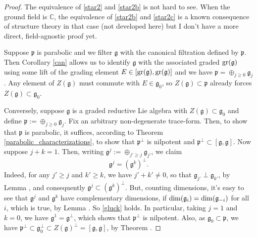 \documentclass[leqno,12pt]{amsart} %
\begin{document}
\begin{proof}
  The equivalence of \eqref{star2} and \eqref{star2b} is not hard to see. When the ground
  field is ${\mathbb C} $, the equivalence of \eqref{star2b} and \eqref{star2c} is a known
  consequence of structure theory in that case (not developed here) but I don't have a
  more direct, field-agnostic proof yet.

  Suppose ${\mathfrak p} $ is parabolic and we filter ${\mathfrak g} $ with the canonical
  filtration defined by ${\mathfrak p}$. Then Corollary \ref{can} allows us to identify
  ${\mathfrak g} $ with the associated graded $\operatorname{\operatorname{gr}}({\mathfrak g})$ using some lift of
  the grading element $E \in [\operatorname{\operatorname{gr}}({\mathfrak g}), \operatorname{\operatorname{gr}}({\mathfrak g})]$ and we have
  ${\mathfrak p} = \oplus_{j\ge 0}{\mathfrak g}_j$. Any element of $Z({\mathfrak g})$ must
  commute with $E \in {\mathfrak g}_0$, so $Z({\mathfrak g}) \subset {\mathfrak p} $
  already forces $Z({\mathfrak g}) \subset {\mathfrak g}_0$.

  Conversely, suppose ${\mathfrak g} $ is a graded reductive Lie algebra with
  $Z({\mathfrak g}) \subset {\mathfrak g}_0$ and define
  ${\mathfrak p}:=\oplus_{j\ge 0}{\mathfrak g}_j$. Fix an arbitrary non-degenerate
  trace-form. Then, to show that ${\mathfrak p} $ is parabolic, it suffices, according to
  Theorem \ref{parabolic_characterizations}, to show that ${\mathfrak p}^\perp$ is
  nilpotent and ${\mathfrak p}^\perp\subset [{\mathfrak g}, {\mathfrak g}]$. Now suppose
  $j + k =1$. Then, writing ${\mathfrak g}^j := \oplus_{j'\ge j}{\mathfrak g}_{j'}$, we
  claim
  \begin{equation}\label{gluck}
    {\mathfrak g}^j = ({\mathfrak g}^k)^\perp.
  \end{equation}
  Indeed, for any $j'\ge j$ and $k' \ge k$, we have $j' + k' \ne 0$, so that
  ${\mathfrak g}_{j'} \perp {\mathfrak g}_{k'}$, by Lemma , and
  consequently ${\mathfrak g}^j \subset ({\mathfrak g}^k)^\perp$. But, counting
  dimensions, it's easy to see that ${\mathfrak g}^j$ and ${\mathfrak g}^k$ have
  complementary dimensions, if
  $\operatorname{dim}({\mathfrak g}_i)=\operatorname{dim}({\mathfrak g}_{-i})$ for all $i$, which is true,
  by Lemma . So \eqref{gluck} holds. In particular, taking $j=1$ and
  $k=0$, we have ${\mathfrak g}^1={\mathfrak g}^\perp$, which shows that
  ${\mathfrak p}^\perp$ is nilpotent. Also, as ${\mathfrak g}_0 \subset {\mathfrak p} $,
  we have
  ${\mathfrak p}^\perp \subset {\mathfrak g}_0^\perp \subset Z({\mathfrak g})^\perp =
  [{\mathfrak g}, {\mathfrak g}]$, by Theorem .


\end{proof}
\end{document}
